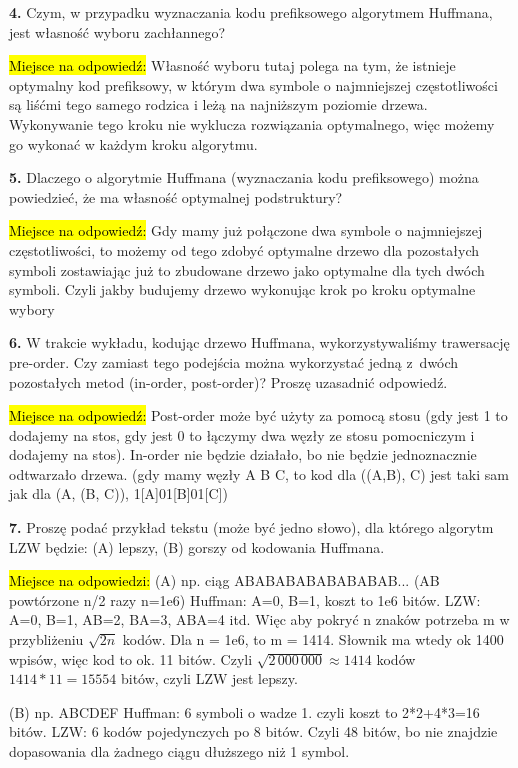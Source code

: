 \documentclass[twoside]{article}
\begin{document}
\textbf{4.} Czym, w przypadku wyznaczania kodu prefiksowego algorytmem Huffmana, jest własność wyboru zachłannego?

\hl{Miejsce na odpowiedź:}
Własność wyboru tutaj polega na tym, że istnieje optymalny kod prefiksowy, w
którym dwa symbole o najmniejszej częstotliwości są liśćmi tego samego rodzica
i leżą na najniższym poziomie drzewa. Wykonywanie tego kroku nie wyklucza
rozwiązania optymalnego, więc możemy go wykonać w każdym kroku algorytmu.
\newline

\textbf{5.} Dlaczego o algorytmie Huffmana (wyznaczania kodu prefiksowego) 
można powiedzieć, że ma własność optymalnej podstruktury?

\hl{Miejsce na odpowiedź:}
Gdy mamy już połączone dwa symbole o najmniejszej częstotliwości, to możemy od
tego zdobyć optymalne drzewo dla pozostałych symboli zostawiając już to
zbudowane drzewo jako optymalne dla tych dwóch symboli. Czyli jakby budujemy
drzewo wykonując krok po kroku optymalne wybory
\newline

\textbf{6.} W trakcie wykładu, kodując drzewo Huffmana, wykorzystywaliśmy trawersację pre-order.
Czy zamiast tego podejścia można wykorzystać jedną z~dwóch pozostałych metod (in-order, post-order)?
Proszę uzasadnić odpowiedź.

\hl{Miejsce na odpowiedź:}
Post-order może być użyty za pomocą stosu (gdy jest 1 to dodajemy na stos, gdy
jest 0 to łączymy dwa węzły ze stosu pomocniczym i dodajemy na stos). In-order
nie będzie działało, bo nie będzie jednoznacznie odtwarzało drzewa. (gdy mamy
węzły A B C, to kod dla ((A,B), C) jest taki sam jak dla (A, (B, C)),
1[A]01[B]01[C])
\newline

\textbf{7.} Proszę podać przykład tekstu (może być jedno słowo), dla którego algorytm LZW będzie:
(A) lepszy, 
(B) gorszy od kodowania Huffmana.

\hl{Miejsce na odpowiedzi:}
(A)  np. ciąg ABABABABABABABAB... (AB powtórzone n/2 razy n=1e6) Huffman: A=0,
B=1, koszt to 1e6 bitów. LZW: A=0, B=1, AB=2, BA=3, ABA=4 itd. Więc aby pokryć
n znaków potrzeba m w przybliżeniu $\sqrt{2n}$ kodów. Dla n = 1e6, to m = 1414.
Słownik ma wtedy ok 1400 wpisów, więc kod to ok. 11 bitów. Czyli
$\sqrt{2\,000\,000} \approx 1414$ kodów $1414 * 11 = 15554$ bitów, czyli LZW
jest lepszy.

(B) np. ABCDEF Huffman: 6 symboli o wadze 1. czyli koszt to 2*2+4*3=16 bitów.
LZW: 6 kodów pojedynczych po 8 bitów. Czyli 48 bitów, bo nie znajdzie
dopasowania dla żadnego ciągu dłuższego niż 1 symbol.
\newline
\end{document}
